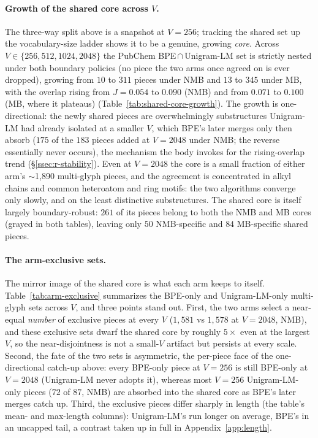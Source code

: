 \documentclass{article}
\begin{document}
\paragraph{Growth of the shared core across $V$.}

The three-way split above is a snapshot at $V{=}256$; tracking
the shared set up the vocabulary-size ladder shows it to be a genuine, growing
\emph{core}. Across $V \in \{256, 512, 1024, 2048\}$ the PubChem
BPE\,$\cap$\,Unigram-LM set is strictly nested under both boundary policies (no
piece the two arms once agreed on is ever dropped), growing from $10$ to $311$
pieces under NMB and $13$ to $345$ under MB, with the overlap rising from
$J{=}0.054$ to $0.090$ (NMB) and from $0.071$ to $0.100$ (MB, where it plateaus)
(Table~\ref{tab:shared-core-growth}). The growth is
one-directional: the newly shared pieces are overwhelmingly substructures
Unigram-LM had already isolated at a smaller $V$, which BPE's later merges only
then absorb ($175$ of the $183$ pieces added at $V{=}2048$ under NMB; the reverse
essentially never occurs), the mechanism the body invokes for the
rising-overlap trend (\S\ref{ssec:r-stability}). Even at $V{=}2048$ the core is a
small fraction of either arm's $\sim$1{,}890 multi-glyph pieces, and the agreement
is concentrated in alkyl chains and common heteroatom and ring motifs: the two
algorithms converge only slowly, and on the least distinctive substructures. The
shared core is itself largely boundary-robust: $261$ of its pieces belong to both
the NMB and MB cores (grayed in both tables), leaving only $50$ NMB-specific and
$84$ MB-specific shared pieces.

\paragraph{The arm-exclusive sets.}

The mirror image of the shared core is what each arm keeps to itself.
Table~\ref{tab:arm-exclusive} summarizes the BPE-only and Unigram-LM-only
multi-glyph sets across $V$, and three points stand out. First, the two arms
select a near-equal \emph{number} of exclusive pieces at every $V$ ($1{,}581$ vs
$1{,}578$ at $V{=}2048$, NMB), and these exclusive sets dwarf the shared core by
roughly $5\times$ even at the largest $V$, so the near-disjointness is not a
small-$V$ artifact but persists at every scale. Second, the fate of the two sets
is asymmetric, the per-piece face of the one-directional catch-up above:
every BPE-only piece at $V{=}256$ is still BPE-only at
$V{=}2048$ (Unigram-LM never adopts it), whereas most $V{=}256$ Unigram-LM-only
pieces ($72$ of $87$, NMB) are absorbed into the shared core as BPE's later merges
catch up. Third, the exclusive pieces differ sharply in length (the table's mean-
and max-length columns): Unigram-LM's run longer on average, BPE's in an uncapped
tail, a contrast taken up in full in Appendix~\ref{app:length}.
\end{document}
